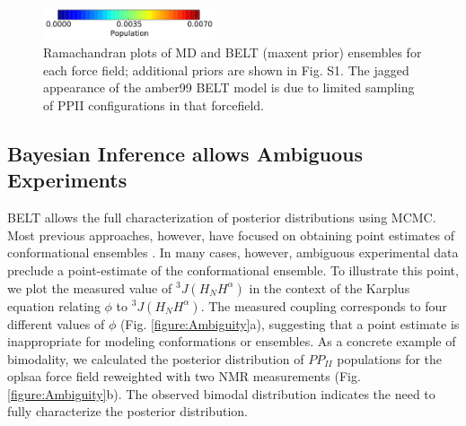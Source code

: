\documentclass[11pt,titlepage]{article}
\begin{document}
\begin{figure}
\includegraphics[width=5.05cm]{figures/ALA3_rama_colorbar.pdf}


\caption{
Ramachandran plots of MD and BELT (maxent prior) ensembles for each force field; additional priors are shown in Fig. S1.  The jagged appearance of the amber99 BELT model is due to limited sampling of PPII configurations in that forcefield.  
}
\label{figure:Rama}
\end{figure}


\subsection*{Bayesian Inference allows Ambiguous Experiments}

BELT allows the full characterization of posterior distributions using MCMC.  Most previous approaches, however, have focused on obtaining point estimates of conformational ensembles  \citep{rozycki2011saxs,  Graf2007}.  In many cases, however, ambiguous experimental data preclude a point-estimate of the conformational ensemble.  To illustrate this point, we plot the measured  \citep{Graf2007} value of $^3J(H_NH^\alpha)$ in the context of the Karplus \citep{vogeli2007limits} equation relating $\phi$ to $^3J(H_NH^\alpha)$.  The measured coupling corresponds to four different values of $\phi$ (Fig. \ref{figure:Ambiguity}a), suggesting that a point estimate is inappropriate for modeling conformations or ensembles.  As a concrete example of bimodality, we calculated the posterior distribution of $PP_{II}$ populations for the oplsaa force field reweighted with two NMR measurements (Fig. \ref{figure:Ambiguity}b).  The observed bimodal distribution indicates the need to fully characterize the posterior 
distribution.  
\end{document}
